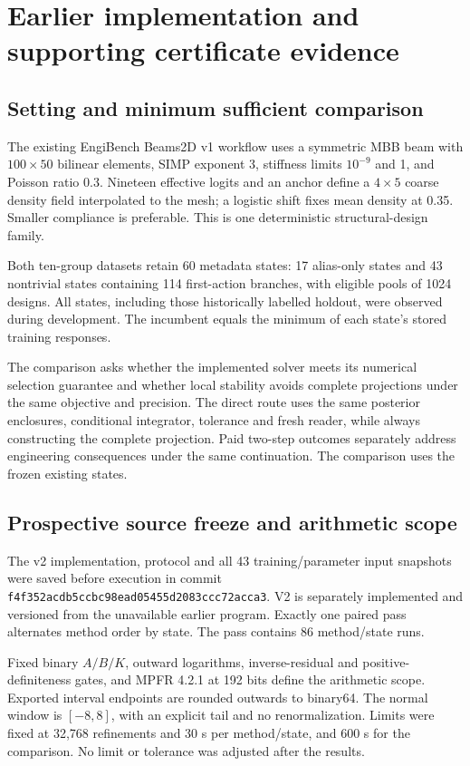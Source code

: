 
\section{Earlier implementation and supporting certificate evidence}\label{sec:positive_results}

\subsection{Setting and minimum sufficient comparison}

The existing EngiBench Beams2D v1 workflow \citep{ref23} uses a symmetric MBB beam with $100\times50$ bilinear elements, SIMP exponent 3, stiffness limits $10^{-9}$ and 1, and Poisson ratio 0.3. Nineteen effective logits and an anchor define a $4\times5$ coarse density field interpolated to the mesh; a logistic shift fixes mean density at 0.35. Smaller compliance is preferable. This is one deterministic structural-design family.

Both ten-group datasets retain 60 metadata states: 17 alias-only states and 43 nontrivial states containing 114 first-action branches, with eligible pools of 1024 designs. All states, including those historically labelled holdout, were observed during development. The incumbent equals the minimum of each state's stored training responses.

The comparison asks whether the implemented solver meets its numerical selection guarantee and whether local stability avoids complete projections under the same objective and precision. The direct route uses the same posterior enclosures, conditional integrator, tolerance and fresh reader, while always constructing the complete projection. Paid two-step outcomes separately address engineering consequences under the same continuation. The comparison uses the frozen existing states.

\subsection{Prospective source freeze and arithmetic scope}

The v2 implementation, protocol and all 43 training/parameter input snapshots were saved before execution in commit \texttt{f4f352acdb5ccbc98ead05455d2083ccc72acca3}. V2 is separately implemented and versioned from the unavailable earlier program. Exactly one paired pass alternates method order by state. The pass contains 86 method/state runs.

Fixed binary $A/B/K$, outward logarithms, inverse-residual and positive-definiteness gates, and MPFR 4.2.1 at 192 bits define the arithmetic scope. Exported interval endpoints are rounded outwards to binary64. The normal window is $[-8,8]$, with an explicit tail and no renormalization. Limits were fixed at 32,768 refinements and 30 s per method/state, and 600 s for the comparison. No limit or tolerance was adjusted after the results.

